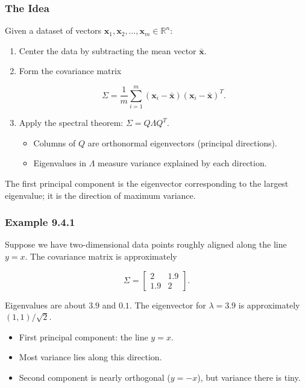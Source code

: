 \documentclass[
  12pt,
  a4paper,
]{article}
\begin{document}
\subsubsection{The Idea}\label{the-idea-2}

Given a dataset of vectors
\(\mathbf{x}_1, \mathbf{x}_2, \dots, \mathbf{x}_m \in \mathbb{R}^n\):

\begin{enumerate}
\def\labelenumi{\arabic{enumi}.}
\item
  Center the data by subtracting the mean vector \(\bar{\mathbf{x}}\).
\item
  Form the covariance matrix

  \[\Sigma = \frac{1}{m} \sum_{i=1}^m (\mathbf{x}_i - \bar{\mathbf{x}})(\mathbf{x}_i - \bar{\mathbf{x}})^T.\]
\item
  Apply the spectral theorem: \(\Sigma = Q \Lambda Q^T\).

  \begin{itemize}
  \item
    Columns of \(Q\) are orthonormal eigenvectors (principal
    directions).
  \item
    Eigenvalues in \(\Lambda\) measure variance explained by each
    direction.
  \end{itemize}
\end{enumerate}

The first principal component is the eigenvector corresponding to the
largest eigenvalue; it is the direction of maximum variance.

\subsubsection{Example 9.4.1}\label{example-941}

Suppose we have two-dimensional data points roughly aligned along the
line \(y = x\). The covariance matrix is approximately

\[\Sigma = \begin{bmatrix} 2 & 1.9 \\ 1.9 & 2 \end{bmatrix}.\]

Eigenvalues are about \(3.9\) and \(0.1\). The eigenvector for
\(\lambda = 3.9\) is approximately \((1,1)/\sqrt{2}\).

\begin{itemize}
\item
  First principal component: the line \(y = x\).
\item
  Most variance lies along this direction.
\item
  Second component is nearly orthogonal (\(y = -x\)), but variance there
  is tiny.
\end{itemize}
\end{document}
